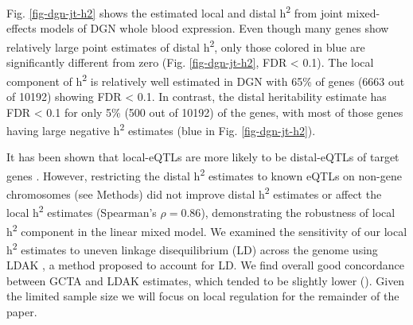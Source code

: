 \documentclass[10pt,letterpaper]{article}
\begin{document}
Fig. \ref{fig-dgn-jt-h2} shows the estimated local and distal h\textsuperscript{2} from joint mixed-effects models of DGN whole blood expression. Even though many genes show relatively large point estimates of distal h\textsuperscript{2}, only those colored in blue are significantly different from zero (Fig. \ref{fig-dgn-jt-h2}, FDR \textless{} 0.1). The local component of h\textsuperscript{2} is relatively well estimated in DGN with 65\% of genes  (6663 out of 10192) showing FDR \textless{} 0.1. %
 In contrast, the distal heritability estimate has FDR \textless{} 0.1 for only 5\% (500 out of 10192) of the genes, with most of those genes having large negative h\textsuperscript{2} estimates (blue in Fig. \ref{fig-dgn-jt-h2}).

It has been shown that local-eQTLs are more likely to be distal-eQTLs of target genes \cite{pierce2014mediation}. However, restricting the distal h\textsuperscript{2} estimates to known eQTLs  on non-gene chromosomes (see Methods) did not improve distal h\textsuperscript{2} estimates or affect the local h\textsuperscript{2} estimates (Spearman's $\rho = 0.86$), demonstrating the robustness of local h\textsuperscript{2} component in the linear mixed model. We examined the sensitivity of our local h\textsuperscript{2} estimates to uneven linkage disequilibrium (LD) across the genome using LDAK \cite{speed2012improved}, a method proposed to account for LD. We find overall good concordance between GCTA and LDAK estimates, which tended to be slightly lower (). Given the limited sample size we will focus on local regulation for the remainder of the paper.
\end{document}
